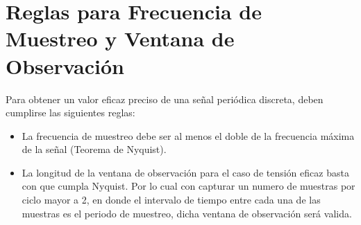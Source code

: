 \documentclass[conference]{IEEEtran}
\theoremstyle{mytheoremstyle}
\theoremstyle{mytheoremstyle}
\theoremstyle{myproblemstyle}
\begin{document}
            \section*{Reglas para Frecuencia de Muestreo y Ventana de Observación}
            Para obtener un valor eficaz preciso de una señal periódica discreta, deben cumplirse las siguientes reglas:
            \begin{itemize}
                \item La frecuencia de muestreo debe ser al menos el doble de la frecuencia máxima de la señal (Teorema de Nyquist).
                \item La longitud de la ventana de observación para el caso de tensión eficaz basta con que cumpla Nyquist. Por lo cual con capturar un numero de muestras por ciclo mayor a 2, en donde el intervalo de tiempo entre cada una de las muestras es el periodo de muestreo, dicha ventana de observación será valida.
            \end{itemize}

        
\end{document}
